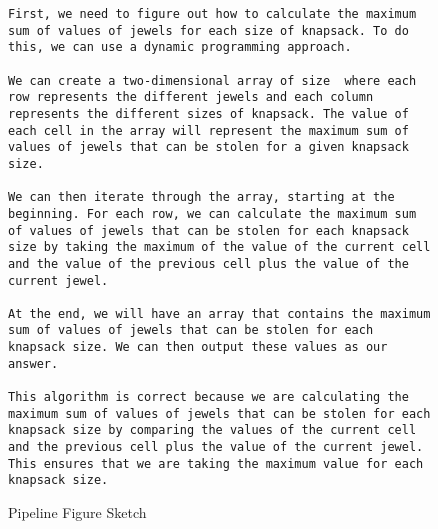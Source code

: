 \begin{figure*}
\begin{lstlisting}
First, we need to figure out how to calculate the maximum sum of values of jewels for each size of knapsack. To do this, we can use a dynamic programming approach. 

We can create a two-dimensional array of size  where each row represents the different jewels and each column represents the different sizes of knapsack. The value of each cell in the array will represent the maximum sum of values of jewels that can be stolen for a given knapsack size. 

We can then iterate through the array, starting at the beginning. For each row, we can calculate the maximum sum of values of jewels that can be stolen for each knapsack size by taking the maximum of the value of the current cell and the value of the previous cell plus the value of the current jewel. 

At the end, we will have an array that contains the maximum sum of values of jewels that can be stolen for each knapsack size. We can then output these values as our answer. 

This algorithm is correct because we are calculating the maximum sum of values of jewels that can be stolen for each knapsack size by comparing the values of the current cell and the previous cell plus the value of the current jewel. This ensures that we are taking the maximum value for each knapsack size.
\end{lstlisting}
\caption{Pipeline Figure Sketch}
\end{figure*}

